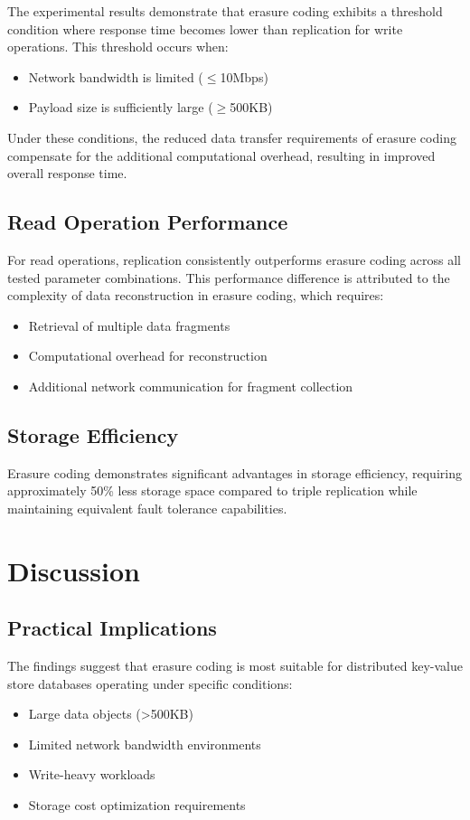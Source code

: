 The experimental results demonstrate that erasure coding exhibits a threshold condition where response time becomes lower than replication for write operations. This threshold occurs when:
\begin{itemize}
\item Network bandwidth is limited ($\leq$10Mbps)
\item Payload size is sufficiently large ($\geq$500KB)
\end{itemize}

Under these conditions, the reduced data transfer requirements of erasure coding compensate for the additional computational overhead, resulting in improved overall response time.

\subsection{Read Operation Performance}

For read operations, replication consistently outperforms erasure coding across all tested parameter combinations. This performance difference is attributed to the complexity of data reconstruction in erasure coding, which requires:
\begin{itemize}
\item Retrieval of multiple data fragments
\item Computational overhead for reconstruction
\item Additional network communication for fragment collection
\end{itemize}

\subsection{Storage Efficiency}

Erasure coding demonstrates significant advantages in storage efficiency, requiring approximately 50\% less storage space compared to triple replication while maintaining equivalent fault tolerance capabilities.

\section{Discussion}

\subsection{Practical Implications}

The findings suggest that erasure coding is most suitable for distributed key-value store databases operating under specific conditions:
\begin{itemize}
\item Large data objects (>500KB)
\item Limited network bandwidth environments
\item Write-heavy workloads
\item Storage cost optimization requirements
\end{itemize}


